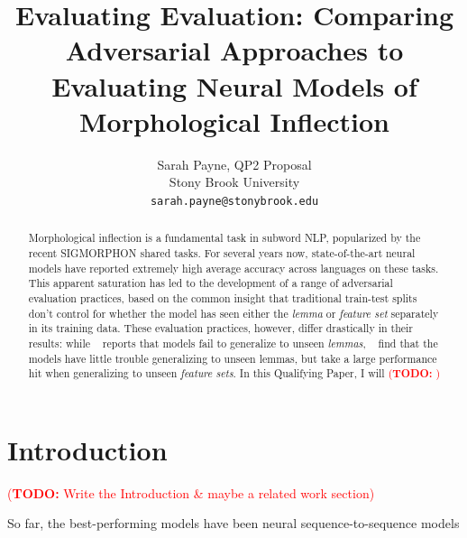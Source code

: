 \documentclass[11pt]{article}
\title{Evaluating Evaluation: Comparing Adversarial Approaches to Evaluating Neural Models of Morphological Inflection}
\author{Sarah Payne, QP2 Proposal\\
  Stony Brook University \\
  \texttt{sarah.payne@stonybrook.edu} }
\newcommand{\todo}[1]{\textcolor{red}{(\textbf{TODO:} #1)}}
\newcommand{\goldmant}{\citet{goldman-etal-2022-un}}
\newcommand{\kodnert}{\citet{kodner-etal-2022-sigmorphon}}
\begin{document}
\maketitle
\begin{abstract}
Morphological inflection is a fundamental task in subword NLP, popularized by the recent SIGMORPHON shared tasks. 
For several years now, state-of-the-art neural models have reported extremely high average accuracy across languages on these tasks. 
This apparent saturation has led to the development of a range of adversarial evaluation practices, based on the common insight that traditional train-test splits don't control for whether the model has seen either the \textit{lemma} or \textit{feature set} separately in its training data. 
These evaluation practices, however, differ drastically in their results: while \goldmant~ reports that models fail to generalize to unseen \textit{lemmas}, \kodnert~ find that the models have little trouble generalizing to unseen lemmas, but take a large performance hit when generalizing to unseen \textit{feature sets}. 
In this Qualifying Paper, I will \todo{}



\end{abstract}

\section{Introduction}

\todo{Write the Introduction \& maybe a related work section}

So far, the best-performing models have been neural sequence-to-sequence models \citep{kann-schutze-2016-med, canby-etal-2020-university}
\end{document}

